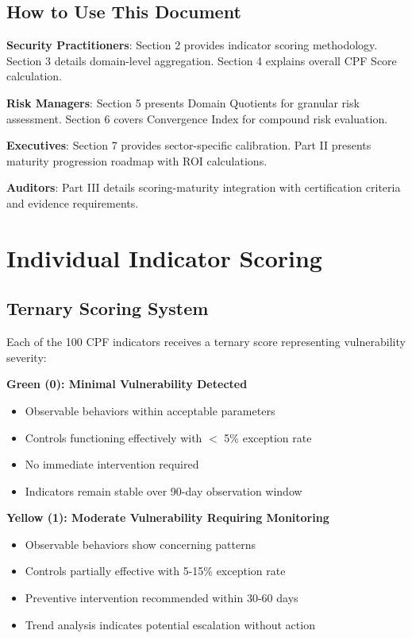 \documentclass[11pt,a4paper]{article}
\begin{document}
\subsection{How to Use This Document}

\textbf{Security Practitioners}: Section 2 provides indicator scoring methodology. Section 3 details domain-level aggregation. Section 4 explains overall CPF Score calculation.

\textbf{Risk Managers}: Section 5 presents Domain Quotients for granular risk assessment. Section 6 covers Convergence Index for compound risk evaluation.

\textbf{Executives}: Section 7 provides sector-specific calibration. Part II presents maturity progression roadmap with ROI calculations.

\textbf{Auditors}: Part III details scoring-maturity integration with certification criteria and evidence requirements.

\section{Individual Indicator Scoring}

\subsection{Ternary Scoring System}

Each of the 100 CPF indicators receives a ternary score representing vulnerability severity:

\textbf{Green (0): Minimal Vulnerability Detected}
\begin{itemize}
\item Observable behaviors within acceptable parameters
\item Controls functioning effectively with $<$ 5\% exception rate
\item No immediate intervention required
\item Indicators remain stable over 90-day observation window
\end{itemize}

\textbf{Yellow (1): Moderate Vulnerability Requiring Monitoring}
\begin{itemize}
\item Observable behaviors show concerning patterns
\item Controls partially effective with 5-15\% exception rate
\item Preventive intervention recommended within 30-60 days
\item Trend analysis indicates potential escalation without action
\end{itemize}
\end{document}
